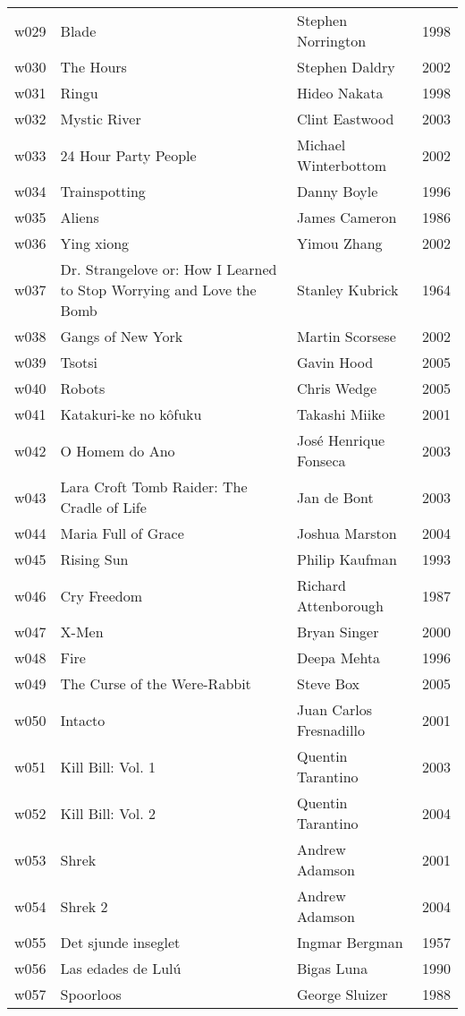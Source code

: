 \documentclass{article}
\begin{document}
\begin {center}
\begin{longtable}{l p{10cm} l l}
w029 & Blade & Stephen Norrington & 1998 \\
w030 & The Hours & Stephen Daldry & 2002 \\
w031 & Ringu & Hideo Nakata & 1998 \\
w032 & Mystic River & Clint Eastwood & 2003 \\
w033 & 24 Hour Party People & Michael Winterbottom & 2002 \\
w034 & Trainspotting & Danny Boyle & 1996 \\
w035 & Aliens & James Cameron & 1986 \\
w036 & Ying xiong & Yimou Zhang & 2002 \\
w037 & Dr. Strangelove or: How I Learned to Stop Worrying and Love the Bomb & Stanley Kubrick & 1964 \\
w038 & Gangs of New York & Martin Scorsese & 2002 \\
w039 & Tsotsi & Gavin Hood & 2005 \\
w040 & Robots & Chris Wedge & 2005 \\
w041 & Katakuri-ke no kôfuku & Takashi Miike & 2001 \\
w042 & O Homem do Ano & José Henrique Fonseca & 2003 \\
w043 & Lara Croft Tomb Raider: The Cradle of Life & Jan de Bont & 2003 \\
w044 & Maria Full of Grace & Joshua Marston & 2004 \\
w045 & Rising Sun & Philip Kaufman & 1993 \\
w046 & Cry Freedom & Richard Attenborough & 1987 \\
w047 & X-Men & Bryan Singer & 2000 \\
w048 & Fire & Deepa Mehta & 1996 \\
w049 & The Curse of the Were-Rabbit & Steve Box & 2005 \\
w050 & Intacto & Juan Carlos Fresnadillo & 2001 \\
w051 & Kill Bill: Vol. 1 & Quentin Tarantino & 2003 \\
w052 & Kill Bill: Vol. 2 & Quentin Tarantino & 2004 \\
w053 & Shrek & Andrew Adamson & 2001 \\
w054 & Shrek 2 & Andrew Adamson & 2004 \\
w055 & Det sjunde inseglet & Ingmar Bergman & 1957 \\
w056 & Las edades de Lulú & Bigas Luna & 1990 \\
w057 & Spoorloos & George Sluizer & 1988 \\

\end{longtable}
\end{center}
\end{document}
